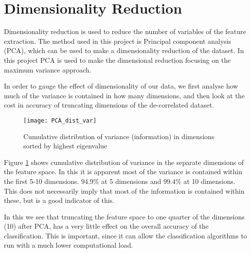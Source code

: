 \section*{Dimensionality Reduction}
Dimensionality reduction is used to reduce the number of variables of the feature extraction.
The method used in this project is Principal component analysis (PCA), which can be used to make a dimensionality reduction of the dataset.
In this project PCA is used to make the dimensional reduction focusing on the maximum variance approach.

In order to gauge the effect of dimensionality of our data, we first analyse how much of the variance is contained in how many dimensions, and then look at the cost in accuracy of truncating dimensions of the de-correlated dataset.

\begin{figure}[H]
\centering
\texttt{[image: PCA\_dist\_var]}
\caption{Cumulative distribution of variance (information) in dimensions sorted by highest eigenvalue}
\label{fig:PCA_dist_rap}
\end{figure}

Figure \ref{fig:PCA_dist_rap} shows cumulative distribution of variance in the separate dimensions of the feature space.
In this it is apparent most of the variance is contained within the first 5-10 dimensions. 
$ 94.9 \% $ at 5 dimensions and $ 99.4 \% $ at 10 dimensions.
This does not necessarily imply that most of the information is contained within these, but is a good indicator of this.

In this we see that truncating the feature space to one quarter of the dimensions (10) after PCA, has a very little effect on the overall accuracy of the classification.
This is important, since it can allow the classification algorithms to run with a much lower computational load.
